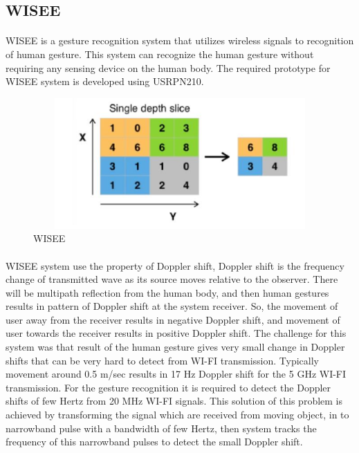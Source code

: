 \documentclass[a4paper,12pt,oneside]{article}
\begin{document}
\subsection{WISEE}
\paragraph{}
WISEE is a gesture recognition system that utilizes wireless signals to recognition of
human gesture. This system can recognize the human gesture without requiring any sensing
device on the human body. The required prototype for WISEE system is developed using USRPN210.

\begin{figure}[H]
\centering
\includegraphics[height=5cm,width=12cm]{2.png}
\caption{WISEE}
\end{figure}

\paragraph{}
 WISEE system use the property of Doppler shift, Doppler shift is the frequency change
of transmitted wave as its source moves relative to the observer. There will be multipath
reflection from the human body, and then human gestures results in pattern of Doppler shift at
the system receiver. So, the movement of user away from the receiver results in negative Doppler
shift, and movement of user towards the receiver results in positive Doppler shift. The challenge
for this system was that result of the human gesture gives very small change in Doppler shifts
that can be very hard to detect from WI-FI transmission. Typically movement around 0.5 m/sec
results in 17 Hz Doppler shift for the 5 GHz WI-FI transmission. For the gesture recognition it is
required to detect the Doppler shifts of few Hertz from 20 MHz WI-FI signals. This solution of
this problem is achieved by transforming the signal which are received from moving object, in to
narrowband pulse with a bandwidth of few Hertz, then system tracks the frequency of this
narrowband pulses to detect the small Doppler shift.
\end{document}
